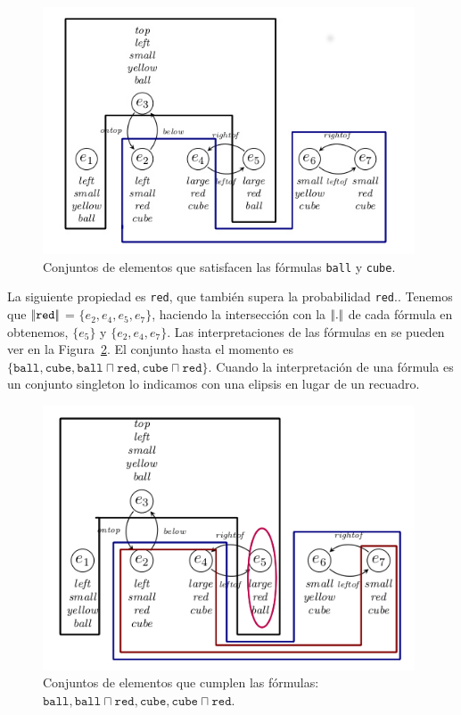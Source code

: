 \begin{figure}[H]
\begin{center}
\includegraphics[width=11cm]{images/im/2ball-cube.jpg}
\caption{Conjuntos de elementos que satisfacen las f\'ormulas \texttt{ball} y \texttt{cube}.}
\label{fig-modelo4}
\end{center}
\end{figure}

La siguiente propiedad es \texttt{red}, que tambi\'en supera la probabilidad \texttt{red}.\randomuse. Tenemos que  
$|\!|\texttt{red}|\!|$ = $\{e_2, e_4, e_5, e_7\}$, haciendo la intersecci\'on con la $|\!|.|\!|$ de cada f\'ormula en \RE obtenemos, 
$\{e_5\}$ y $\{e_2, e_4, e_7\}$. Las interpretaciones de las f\'ormulas en \RE se pueden ver en la Figura~\ref{fig-modelo9}. El conjunto \RE hasta el momento es $\{\texttt{ball}, \texttt{cube}, \texttt{ball} \sqcap \texttt{red}, \texttt{cube} \sqcap \texttt{red}\}$. Cuando la interpretaci\'on de una f\'ormula es un conjunto singleton lo indicamos con una elipsis en lugar de un recuadro.

\begin{figure}[H]
\begin{center}
\includegraphics[width=11cm]{images/im/rojo.png}
\caption{Conjuntos de elementos que cumplen las f\'ormulas: $\texttt{ball}, \texttt{ball} \sqcap \texttt{red}, \texttt{cube},\texttt{cube} \sqcap \texttt{red}$.}
\label{fig-modelo9}
\end{center}
\end{figure}    

